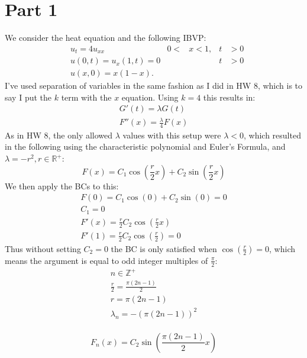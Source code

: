 \documentclass{article}
\begin{document}
\section*{Part 1}
We consider the heat equation and the following IBVP:
\begin{align*}
&u_t=4u_{xx} & 0<&x<1, & t&> 0\\
&u(0, t)= u_x(1, t) = 0 && & t&> 0\\
&u(x,0)= x(1-x). && &&
\end{align*}
I've used separation of variables in the same fashion as I did in HW 8, which is to say I put the $k$ term with the $x$ equation. Using $k = 4$ this results in:
\begin{equation}
\begin{aligned}
G'(t) = \lambda G(t)\\
F''(x) = \frac{\lambda}{4}F(x)
\end{aligned}
\end{equation}
As in HW 8, the only allowed $\lambda$ values with this setup were $\lambda < 0$, which resulted in the following using the characteristic polynomial and Euler's Formula, and $\lambda = -r^2, r \in \mathbb{R}^+$:
\begin{equation}
F(x) = C_1\cos(\frac{r}{2}x) + C_2\sin(\frac{r}{2}x)
\end{equation}
We then apply the BCs to this:
\begin{equation}
\begin{aligned}
F(0) = C_1\cos(0) + C_2\sin(0) = 0\\
C_1 = 0\\
F'(x) = \frac{r}{2}C_2\cos(\frac{r}{2}x)\\
F'(1) = \frac{r}{2}C_2\cos(\frac{r}{2}) = 0
\end{aligned}
\end{equation}
Thus without setting $C_2 = 0$ the BC is only satisfied when $\cos(\frac{r}{2}) = 0$, which means the argument is equal to odd integer multiples of $\frac{\pi}{2}$:
\begin{equation}
\begin{aligned}
n \in \mathbb{Z}^+\\
\frac{r}{2} = \frac{\pi (2n-1)}{2}\\
r = \pi (2n-1)\\
\lambda_n = - ( \pi(2n-1))^2\\
\end{aligned}
\end{equation}
\begin{tcolorbox}[minipage,colback=white,arc=0pt,outer arc=0pt]
\begin{equation}
F_n(x) = C_2\sin(\frac{\pi(2n-1)}{2}x)
\end{equation}
\end{tcolorbox}
\end{document}
